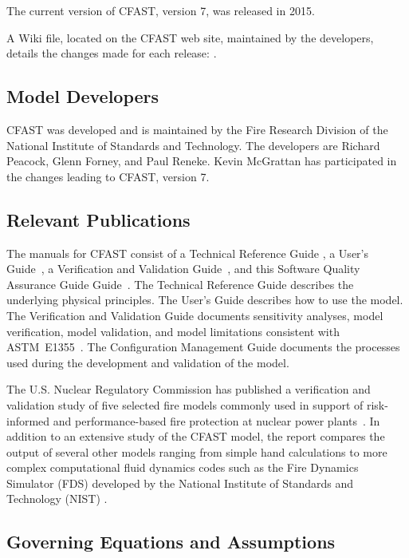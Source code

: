\documentclass[11pt]{book}
\begin{document}
The current version of CFAST, version 7, was released in 2015.

A Wiki file, located on the CFAST web site, maintained by the developers, details the changes made for each release: \href{https://github.com/firemodels/cfast/wiki/Release-Notes}{}.


\subsection{Model Developers}

CFAST was developed and is maintained by the Fire Research Division of the National Institute of Standards and Technology. The developers are Richard Peacock, Glenn Forney, and Paul Reneke. Kevin McGrattan has participated in the changes leading to CFAST, version 7.

\subsection{Relevant Publications}

The manuals for CFAST consist of a Technical Reference Guide \cite{CFAST_Tech_Guide_7}, a User's Guide~\cite{CFAST_Users_Guide_7}, a Verification and Validation Guide~\cite{CFAST_Valid_Guide_7}, and this Software Quality Assurance Guide Guide~\cite{SQA_Guide}.  The Technical Reference Guide describes the underlying physical principles. The User's Guide describes how to use the model. The Verification and Validation Guide documents sensitivity analyses, model verification, model validation, and model limitations consistent with ASTM~E1355~\cite{ASTM:E1355}. The Configuration Management Guide documents the processes used during the development and validation of the model.

The U.S. Nuclear Regulatory Commission has published a verification and validation study of five selected fire models commonly used in support of risk-informed and performance-based fire protection at nuclear power plants~\cite{NRCNUREG1824}. In addition to an extensive study of the CFAST model, the report compares the output of several other models ranging from simple hand calculations to more complex computational fluid dynamics codes such as the Fire Dynamics Simulator (FDS) developed by the National Institute of Standards and Technology (NIST) \cite{FDS_Tech_Guide}.


\subsection{Governing Equations and Assumptions}
\end{document}
